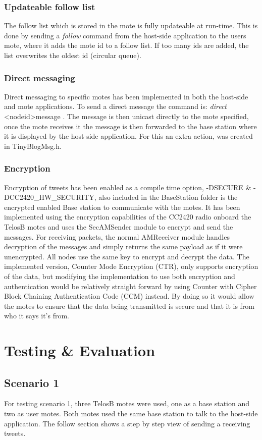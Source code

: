 \documentclass{article}
\begin{document}
\subsubsection{Updateable follow list}
The follow list which is stored in the mote is fully updateable at run-time. This is done by sending a \textit{follow} command from the host-side application to the users mote, where it adds the mote id to a follow list. If too many ids are added, the list overwrites the oldest id (circular queue).
\subsubsection{Direct messaging}
Direct messaging to specific motes has been implemented in both the host-side and mote applications. To send a direct message the command is: \textit{direct} \textless nodeid\textgreater message .
The message is then unicast directly to the mote specified, once the mote receives it the message is then forwarded to the base station where it is displayed by the host-side application. For this an extra action, was created in TinyBlogMsg.h.
\subsubsection{Encryption}
Encryption of tweets has been enabled as a compile time option, -DSECURE \& -DCC2420\_HW\_SECURITY, also included in the BaseStation folder is the encrypted enabled Base station to communicate with the motes. It has been implemented using the encryption capabilities of the CC2420 radio onboard the TelosB motes and uses the SecAMSender module to encrypt and send the messages. For receiving packets, the normal AMReceiver module handles decryption of the messages and simply returns the same payload as if it were unencrypted. All nodes use the same key to encrypt and decrypt the data.
The implemented version, Counter Mode Encryption (CTR), only supports encryption of the data, but modifying the implementation to use both encryption and authentication would be relatively straight forward by using Counter with Cipher Block Chaining Authentication Code (CCM) instead. By doing so it would allow the motes to ensure that the data being transmitted is secure and that it is from who it says it's from. 


\section{Testing \& Evaluation}
\subsection{Scenario 1}
For testing scenario 1, three TelosB motes were used, one as a base station and two as user motes. Both motes used the same base station to talk to the host-side application. The follow section shows a step by step view of sending a receiving tweets.
\end{document}
